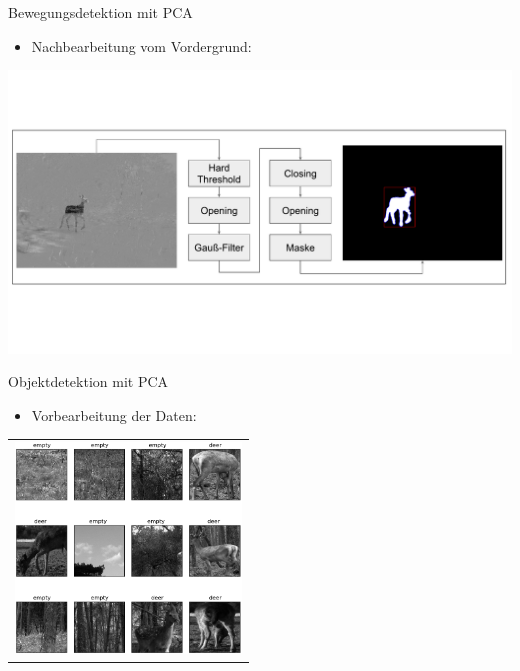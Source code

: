 \begin{frame}[t,fragile]{Bewegungsdetektion mit PCA}
	\begin{itemize}
 \item{Nachbearbeitung vom Vordergrund:}
  \end{itemize}
        \includegraphics[width=14cm]{img/Segmentierung/pipeline-post2.pdf}
\end{frame}

\begin{frame}[t,fragile]{Objektdetektion mit PCA}
	\begin{itemize}
 \item{Vorbearbeitung der Daten:}
  \end{itemize}
       
  \vspace{0.01em}
  {
\begin{table}
\centering
        \begin{tabular}{c}
     \includegraphics[width=6cm]{img/Segmentierung/data-PCA}
         \end{tabular}
        
\end{table}
 }
\end{frame}

